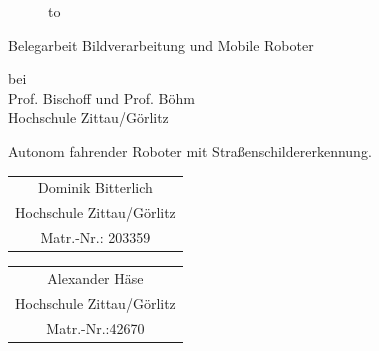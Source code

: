 \begin{titlepage}

\large
\begin{figure}
  \begin{center}
    \hbox to 
  \end{center}
\end{figure}

\begin{center}
\rule{0pt}{0pt}

\begin{huge}
Belegarbeit Bildverarbeitung und Mobile Roboter
\end{huge}
\vspace{.5cm}
\begin{center}
bei\\
\vspace{.5cm}
Prof. Bischoff und Prof. Böhm \\Hochschule Zittau/Görlitz
\end{center}


\vspace{2cm}

Autonom fahrender Roboter mit Straßenschildererkennung.\\

\vspace*{2cm}

\begin{tabular}[m]{c}
Dominik Bitterlich \\Hochschule Zittau/Görlitz\\ Matr.-Nr.: 203359
\end{tabular}
\hspace*{4cm}
\vspace*{.5cm}
\begin{tabular}[m]{c}
Alexander Häse \\Hochschule Zittau/Görlitz\\ Matr.-Nr.:42670
\end{tabular}


\end{center}
\end{titlepage}
